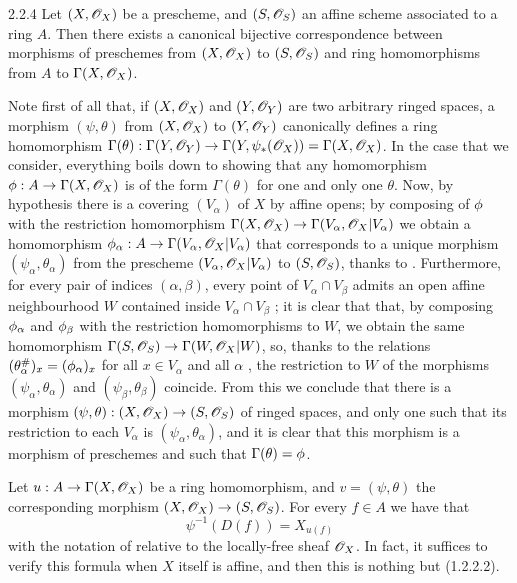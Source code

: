 \documentclass[10pt,oneside]{book}
\begin{document}
\begin{envs}[Proposition]{2.2.4}
\label{prop-1.2.2.4}
Let $(X,\mathscr{O}_X)$ be a prescheme, and $(S,\mathscr{O}_S)$ an
affine scheme associated to a ring $A$. Then there exists a canonical bijective
correspondence between morphisms of preschemes from $(X,\mathscr{O}_X)$ to $(S,\mathscr{O}_S)$ and
ring homomorphisms from $A$ to $\Gamma(X,\mathscr{O}_X)$.
\end{envs}

Note first of all that, if $(X,\mathscr{O}_X)$ and $(Y,\mathscr{O}_Y)$ are two arbitrary ringed spaces,
a morphism $(\psi,\theta)$ from $(X,\mathscr{O}_X)$ to $(Y,\mathscr{O}_Y)$ canonically defines a ring
homomorphism
$\Gamma(\theta):\Gamma(Y,\mathscr{O}_Y)\to\Gamma(Y,\psi_*(\mathscr{O}_X))=\Gamma(X,\mathscr{O}_X)$.
In the case that we consider, everything boils down to showing that any
homomorphism $\phi:A\to\Gamma(X,\mathscr{O}_X)$ is of the form $\Gamma(\theta)$
for one and only one $\theta$. Now, by hypothesis there is a covering
$(V_\alpha)$ of $X$ by affine opens; by composing of $\phi$ with the
restriction homomorphism $\Gamma(X,\mathscr{O}_X)\to\Gamma(V_\alpha,\mathscr{O}_X|V_\alpha)$ we
obtain a homomorphism $\phi_\alpha:A\to\Gamma(V_\alpha,\mathscr{O}_X|V_\alpha)$
that corresponds to a unique morphism $(\psi_\alpha,\theta_\alpha)$ from the
prescheme $(V_\alpha,\mathscr{O}_X|V_\alpha)$ to $(S,\mathscr{O}_S)$, thanks to .
Furthermore, for every pair of indices $(\alpha,\beta)$, every point of
$V_\alpha\cap V_\beta$ admits an open affine neighbourhood $W$ contained inside
$V_\alpha\cap V_\beta$ ; it is clear that that, by composing
$\phi_\alpha$ and $\phi_\beta$ with the restriction homomorphisms to $W$,
we obtain the same homomorphism $\Gamma(S,\mathscr{O}_S)\to\Gamma(W,\mathscr{O}_X|W)$, so, thanks
to the relations $(\theta_\alpha^\#)_x=(\phi_\alpha)_x$ for all $x\in
V_\alpha$ and all $\alpha$ , the restriction to $W$ of the morphisms
$(\psi_\alpha,\theta_\alpha)$ and $(\psi_\beta,\theta_\beta)$ coincide. From
this we conclude that there is a morphism
$(\psi,\theta):(X,\mathscr{O}_X)\to(S,\mathscr{O}_S)$ of ringed spaces, and only one such
that its restriction to each $V_\alpha$ is $(\psi_\alpha,\theta_\alpha)$, and it
is clear that this morphism is a morphism of preschemes and such that
$\Gamma(\theta)=\phi$.

Let $u:A\to\Gamma(X,\mathscr{O}_X)$ be a ring homomorphism, and $v=(\psi,\theta)$
the corresponding morphism $(X,\mathscr{O}_X)\to(S,\mathscr{O}_S)$. For every $f\in A$ we have
that
\[
  \psi^{-1}(D(f))=X_{u(f)}\tag{2.2.4.1}
\]
with the notation of  relative to the locally-free sheaf
$\mathscr{O}_X$. In fact, it suffices to verify this formula when $X$ itself is affine,
and then this is nothing but (1.2.2.2).
\end{document}
